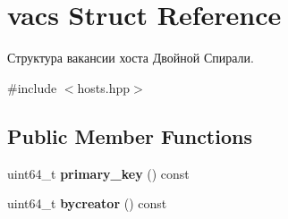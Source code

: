 \hypertarget{structvacs}{}\section{vacs Struct Reference}
\label{structvacs}


Структура вакансии хоста Двойной Спирали.  




{\ttfamily \#include $<$hosts.\+hpp$>$}

\subsection*{Public Member Functions}
\begin{DoxyCompactItemize}
\item 
\mbox{\label{structvacs_ae84328b732c9610c831056ffe9afcc4e}} 
uint64\+\_\+t {\bfseries primary\+\_\+key} () const
\item 
\mbox{\label{structvacs_a37e7e3920a78ac5daf2491bb5991cdca}} 
uint64\+\_\+t {\bfseries bycreator} () const
\end{DoxyCompactItemize}

